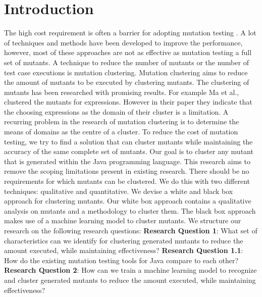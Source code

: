 \documentclass[conference]{IEEEtran}
\begin{document}
\begin{IEEEkeywords}

\end{IEEEkeywords}

\section{Introduction}
The high cost requirement is often a barrier for adopting mutation testing \cite{Pizzoleto2019}.
A lot of techniques and methods have been developed to improve the performance, however, most of these approaches are not as effective as mutation testing a full set of mutants\cite{Pizzoleto2019,Yao2014}. 
\newline
A technique to reduce the number of mutants or the number of test case executions is mutation clustering.
Mutation clustering aims to reduce the amount of mutants to be executed by clustering mutants\cite{Ma2016,Yu2019PossibilityScope}.
The clustering of mutants has been researched with promising results\cite{Ji2009,Wilinski2015,Ma2016}. For example Ma et al., \cite{Ma2016} clustered the mutants for expressions. 
However in their paper they indicate that the choosing expressions as the domain of their cluster is a limitation.
A recurring problem in the research of mutation clustering is to determine the means of domains as the centre of a cluster\cite{Ji2009,Wilinski2015,Ma2016,Wei2021SpectralTesting}.
\newline
To reduce the cost of mutation testing, we try to find a solution that can cluster mutants while maintaining the accuracy of the same complete set of mutants. 
Our goal is to cluster any mutant that is generated within the Java programming language.
This research aims to remove the scoping limitations present in existing research.
There should be no requirements for which mutants can be clustered.
We do this with two different techniques: qualitative and quantitative.
We devise a white and black box approach for clustering mutants.
Our white box approach contains a qualitative analysis on mutants and a methodology to cluster them.
The black box approach makes use of a machine learning model to cluster mutants.
We structure our research on the following research questions:
\newline
\textbf{Research Question 1}: What set of characteristics can we identify for clustering generated mutants to reduce the amount executed, while maintaining effectiveness?
\newline
\textbf{Research Question 1.1}: How do the existing mutation testing tools for Java compare to each other?
\newline
\textbf{Research Question 2}: How can we train a machine learning model to recognize and cluster generated mutants to reduce the amount executed, while maintaining effectiveness?
\end{document}
